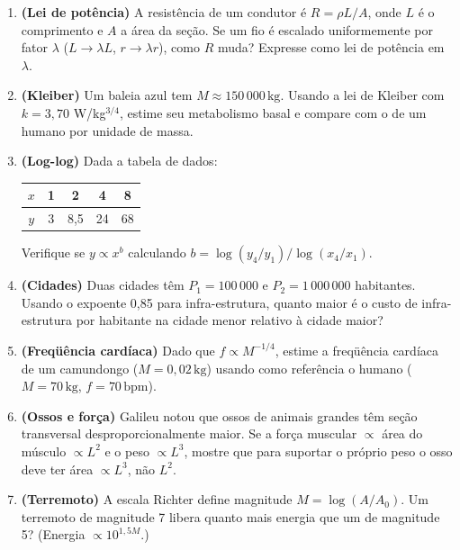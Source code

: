 \documentclass[12pt,a4paper]{article}
\begin{document}
\begin{enumerate}
  \item \textbf{(Lei de pot\^encia)} A resist\^encia de um condutor \'e $R = \rho L / A$, onde $L$ \'e o comprimento e $A$ a \'area da se\c{c}\~ao. Se um fio \'e escalado uniformemente por fator $\lambda$ ($L \to \lambda L$, $r \to \lambda r$), como $R$ muda? Expresse como lei de pot\^encia em $\lambda$.
  
  \item \textbf{(Kleiber)} Um bale\-ia azul tem $M \approx 150\,000\,\text{kg}$. Usando a lei de Kleiber com $k = 3{,}70$ W/kg$^{3/4}$, estime seu metabolismo basal e compare com o de um humano por unidade de massa.
  
  \item \textbf{(Log-log)} Dada a tabela de dados:
    \begin{center}
    \begin{tabular}{|c|c|c|c|c|}
    \hline
    $x$ & 1 & 2 & 4 & 8 \\ \hline
    $y$ & 3 & 8{,}5 & 24 & 68 \\ \hline
    \end{tabular}
    \end{center}
    Verifique se $y \propto x^b$ calculando $b = \log(y_4/y_1)/\log(x_4/x_1)$.
  
  \item \textbf{(Cidades)} Duas cidades t\^em $P_1 = 100\,000$ e $P_2 = 1\,000\,000$ habitantes. Usando o expoente 0{,}85 para infra-estrutura, quanto maior \'e o custo de infra-estrutura por habitante na cidade menor relativo \`a cidade maior?
  
  \item \textbf{(Freq\"u\^encia card\'iaca)} Dado que $f \propto M^{-1/4}$, estime a freq\"u\^encia card\'iaca de um camundongo ($M=0{,}02\,\text{kg}$) usando como refer\^encia o humano ($M=70\,\text{kg}$, $f=70\,\text{bpm}$).
  
  \item \textbf{(Ossos e for\c{c}a)} Galileu notou que ossos de animais grandes t\^em se\c{c}\~ao transversal desproporcionalmente maior. Se a for\c{c}a muscular $\propto$ \'area do m\'usculo $\propto L^2$ e o peso $\propto L^3$, mostre que para suportar o pr\'oprio peso o osso deve ter \'area $\propto L^3$, n\~ao $L^2$.
  
  \item \textbf{(Terremoto)} A escala Richter define magnitude $M = \log(A/A_0)$. Um terremoto de magnitude 7 libera quanto mais energia que um de magnitude 5? (Energia $\propto 10^{1{,}5 M}$.)
\end{enumerate}
\end{document}
